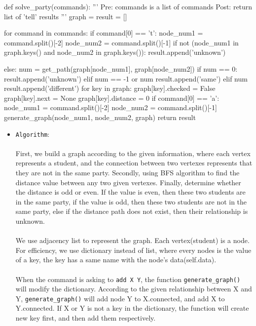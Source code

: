 \documentclass{assignment-263}
\begin{document}
\begin{enumerate}
\begin{python}
     
     
def solve_party(commands):
      '''
      Pre: commands is a list of commands
      Post: return list of 'tell' results
      '''
      graph = {}
      result = []
      
      for command in commands:
            if command[0] == 't':
                  node_num1 = command.split()[-2]
                  node_num2 = command.split()[-1]
                  if not (node_num1 in graph.keys() and node_num2 in graph.keys()):
                        result.append('unknown')

                  else:
                        num = get_path(graph[node_num1], graph[node_num2])
                        if num == 0:
                              result.append('unknown')
                        elif num == -1 or num%
                              result.append('same')
                        elif num%
                              result.append('different')
                        for key in graph:
                              graph[key].checked = False
                              graph[key].next = None
                              graph[key].distance = 0
            if command[0] == 'a':
                  node_num1 = command.split()[-2]
                  node_num2 = command.split()[-1]
                  generate_graph(node_num1, node_num2, graph)
      return result
\end{python}
\begin{itemize}
\item \verb|Algorithm|:\\
\\First, we build a graph according to the given information, where each vertex represents a student, and the connection between two vertexes represents that they are not in the same party. Secondly, using BFS algorithm to find the distance value between any two given vertexes. Finally, determine whether the distance is odd or even. If the value is even, then these two students are in the same party, if the value is odd, then these two students are not in the same party, else if the distance path does not exist, then their relationship is unknown.\\
\\
We use adjacency list to represent the graph. Each vertex(student) is a node. For efficiency, we use dictionary instead of list, where every nodes is the value of a key, the key has a same name with the node's data(self.data).\\ 
\\When the command is asking to \verb|add X Y|, the function \verb|generate_graph()| will modify the dictionary. According to the given relationship between X and Y, \verb|generate_graph()| will add node Y to X.connected, and add X to Y.connected. If X or Y is not a key in the dictionary, the function will create new key first, and then add them respectively. \\

\end{itemize}
\end{enumerate}
\end{document}
